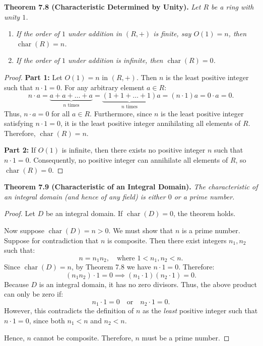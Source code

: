 \documentclass[11pt,a4paper]{article}
\DeclareMathOperator{\charac}{char}
\begin{document}
\begin{thmbox}
\textbf{Theorem 7.8 (Characteristic Determined by Unity).} \textit{Let $R$ be a ring with unity $1$.}
\begin{enumerate}[label=\textbf{\arabic*)}]
    \item \textit{If the order of $1$ under addition in $(R, +)$ is finite, say $O(1) = n$, then $\charac(R) = n$.}
    \item \textit{If the order of $1$ under addition is infinite, then $\charac(R) = 0$.}
\end{enumerate}
\end{thmbox}

\begin{proof}
\textbf{Part 1:} Let $O(1) = n$ in $(R, +)$. Then $n$ is the least positive integer such that $n \cdot 1 = 0$. For any arbitrary element $a \in R$:
\[
n \cdot a = \underbrace{a + a + \dots + a}_{n \text{ times}} = \underbrace{(1 + 1 + \dots + 1)}_{n \text{ times}} a = (n \cdot 1)a = 0 \cdot a = 0.
\]
Thus, $n \cdot a = 0$ for all $a \in R$. Furthermore, since $n$ is the least positive integer satisfying $n \cdot 1 = 0$, it is the least positive integer annihilating all elements of $R$. Therefore, $\charac(R) = n$.

\medskip
\noindent \textbf{Part 2:} If $O(1)$ is infinite, then there exists no positive integer $n$ such that $n \cdot 1 = 0$. Consequently, no positive integer can annihilate all elements of $R$, so $\charac(R) = 0$.
\end{proof}

\begin{thmbox}
\textbf{Theorem 7.9 (Characteristic of an Integral Domain).} \textit{The characteristic of an integral domain (and hence of any field) is either $0$ or a prime number.}
\end{thmbox}

\begin{proof}
Let $D$ be an integral domain. If $\charac(D) = 0$, the theorem holds. 

Now suppose $\charac(D) = n > 0$. We must show that $n$ is a prime number. Suppose for contradiction that $n$ is composite. Then there exist integers $n_1, n_2$ such that:
\[
n = n_1 n_2, \quad \text{where } 1 < n_1, n_2 < n.
\]
Since $\charac(D) = n$, by Theorem 7.8 we have $n \cdot 1 = 0$. Therefore:
\[
(n_1 n_2) \cdot 1 = 0 \implies (n_1 \cdot 1)(n_2 \cdot 1) = 0.
\]
Because $D$ is an integral domain, it has no zero divisors. Thus, the above product can only be zero if:
\[
n_1 \cdot 1 = 0 \quad \text{or} \quad n_2 \cdot 1 = 0.
\]
However, this contradicts the definition of $n$ as the \textit{least} positive integer such that $n \cdot 1 = 0$, since both $n_1 < n$ and $n_2 < n$. 

Hence, $n$ cannot be composite. Therefore, $n$ must be a prime number.
\end{proof}
\end{document}
